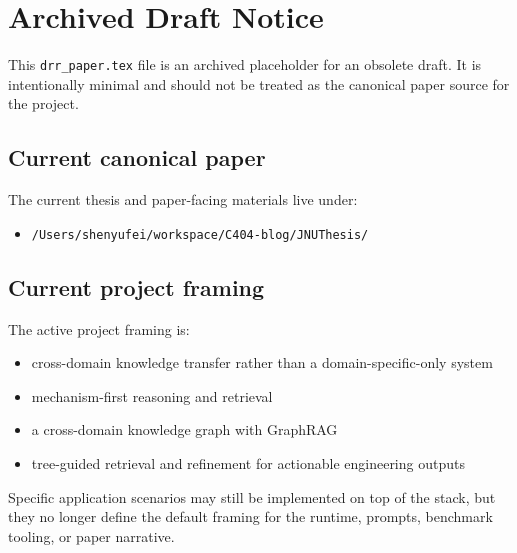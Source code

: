 \documentclass[11pt]{article}
\begin{document}
\section*{Archived Draft Notice}

This \texttt{drr\_paper.tex} file is an archived placeholder for an obsolete
draft. It is intentionally minimal and should not be treated as the canonical
paper source for the project.

\subsection*{Current canonical paper}

The current thesis and paper-facing materials live under:

\begin{itemize}
  \item \texttt{/Users/shenyufei/workspace/C404-blog/JNUThesis/}
\end{itemize}

\subsection*{Current project framing}

The active project framing is:

\begin{itemize}
  \item cross-domain knowledge transfer rather than a domain-specific-only system
  \item mechanism-first reasoning and retrieval
  \item a cross-domain knowledge graph with GraphRAG
  \item tree-guided retrieval and refinement for actionable engineering outputs
\end{itemize}

Specific application scenarios may still be implemented on top of the stack,
but they no longer define the default framing for the runtime, prompts,
benchmark tooling, or paper narrative.
\end{document}
